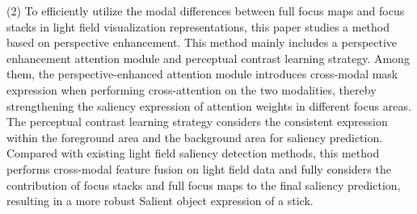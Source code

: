 \begin{englishabstract}
(2)
%
%
To efficiently utilize the modal differences between full focus maps and focus stacks in light field visualization representations, this paper studies a method based on perspective enhancement. This method mainly includes a perspective enhancement attention module and perceptual contrast learning strategy. Among them, the perspective-enhanced attention module introduces cross-modal mask expression when performing cross-attention on the two modalities, thereby strengthening the saliency expression of attention weights in different focus areas. The perceptual contrast learning strategy considers the consistent expression within the foreground area and the background area for saliency prediction. Compared with existing light field saliency detection methods, this method performs cross-modal feature fusion on light field data and fully considers the contribution of focus stacks and full focus maps to the final saliency prediction, resulting in a more robust Salient object expression of a stick.


	
	
\end{englishabstract}






